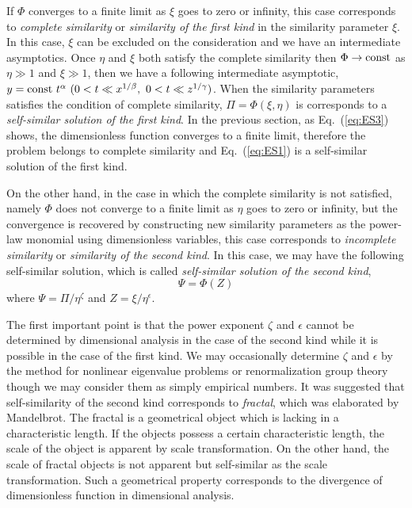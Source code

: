 \documentclass[aps,prl,superscriptaddress]{revtex4}  %
\begin{document}
If $\Phi$ converges to a finite limit as $\xi$ goes to zero or infinity, this case corresponds to {\it complete similarity} or {\it similarity of the first kind} in the similarity parameter $\xi$. In this case, $\xi$ can be excluded on the consideration and we have an intermediate asymptotics. Once $\eta$ and $\xi$ both satisfy the complete similarity then $\Phi \rightarrow {\rm const}$ as $\eta \gg 1$ and $\xi \gg 1$, then we have a following intermediate asymptotic, $y = {\rm const}~t^{\alpha}~(0 < t \ll x^{1/\beta},~0 < t \ll z^{1/\gamma})$. When the similarity parameters satisfies the condition of complete similarity, $\Pi = \Phi( \xi, \eta )$ is corresponds to a {\it self-similar solution of the first kind}. In the previous section, as Eq.~(\ref{eq:ES3}) shows, the dimensionless function converges to a finite limit, therefore the problem belongs to complete similarity and Eq.~(\ref{eq:ES1}) is a self-similar solution of the first kind.

On the other hand, in the case in which the complete similarity is not satisfied, namely $\Phi$ does not converge to a finite limit as $\eta$ goes to zero or infinity, but the convergence is recovered by constructing new similarity parameters as the power-law monomial using dimensionless variables, this case corresponds to {\it incomplete similarity} or {\it similarity of the second kind}. In this case, we may have the following self-similar solution, which is called {\it self-similar solution of the second kind},
%
\begin{equation}
\Psi = \Phi(Z)
\label{eq:ES8}
\end{equation}
%
where $\Psi = \Pi / \eta^{\zeta}$ and $Z = \xi / \eta^{\epsilon}$. 

The first important point is that the power exponent $\zeta$ and $\epsilon$ cannot be determined by dimensional analysis in the case of the second kind while it is possible in the case of the first kind. We may occasionally determine $\zeta$ and $\epsilon$ by the method for nonlinear eigenvalue problems\cite{NEP} or renormalization group theory\cite{Goldenfeld1992,Goldenfeld} though we may consider them as simply empirical numbers\cite{Barenblatt1981}. It was suggested that self-similarity of the second kind corresponds to {\it fractal}\cite{fractal, Mandelbrot1983}, which was elaborated by Mandelbrot. The fractal is a geometrical object which is lacking in a characteristic length. If the objects possess a certain characteristic length, the scale of the object is apparent by scale transformation. On the other hand, the scale of fractal objects is not apparent but self-similar as the scale transformation. Such a geometrical property corresponds to the divergence of dimensionless function in dimensional analysis. 
 
\end{document}
